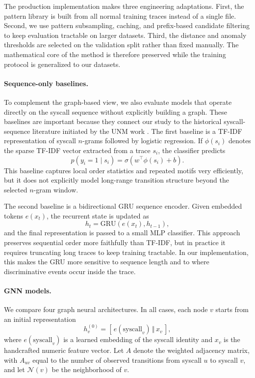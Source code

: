 \documentclass{article}
\begin{document}
The production implementation makes three engineering adaptations. First, the pattern library is built from all normal training traces instead of a single file. Second, we use pattern subsampling, caching, and prefix-based candidate filtering to keep evaluation tractable on larger datasets. Third, the distance and anomaly thresholds are selected on the validation split rather than fixed manually. The mathematical core of the method is therefore preserved while the training protocol is generalized to our datasets.

\paragraph{Sequence-only baselines.}
To complement the graph-based view, we also evaluate models that operate directly on the syscall sequence without explicitly building a graph. These baselines are important because they connect our study to the historical syscall-sequence literature initiated by the UNM work \cite{unm_syscalls,alt_syscall_models}. The first baseline is a TF-IDF representation of syscall $n$-grams followed by logistic regression. If $\phi(s_i)$ denotes the sparse TF-IDF vector extracted from a trace $s_i$, the classifier predicts
\[
p(y_i=1 \mid s_i) = \sigma(w^\top \phi(s_i) + b).
\]
This baseline captures local order statistics and repeated motifs very efficiently, but it does not explicitly model long-range transition structure beyond the selected $n$-gram window.

The second baseline is a bidirectional GRU sequence encoder. Given embedded tokens $e(x_t)$, the recurrent state is updated as
\[
h_t = \mathrm{GRU}(e(x_t), h_{t-1}),
\]
and the final representation is passed to a small MLP classifier. This approach preserves sequential order more faithfully than TF-IDF, but in practice it requires truncating long traces to keep training tractable. In our implementation, this makes the GRU more sensitive to sequence length and to where discriminative events occur inside the trace.

\paragraph{GNN models.}
We compare four graph neural architectures. In all cases, each node $v$ starts from an initial representation
\[
h_v^{(0)} = [\,e(\mathrm{syscall}_v)\, \Vert \, x_v\,],
\]
where $e(\mathrm{syscall}_v)$ is a learned embedding of the syscall identity and $x_v$ is the handcrafted numeric feature vector. Let $A$ denote the weighted adjacency matrix, with $A_{uv}$ equal to the number of observed transitions from syscall $u$ to syscall $v$, and let $\mathcal{N}(v)$ be the neighborhood of $v$.
\end{document}
